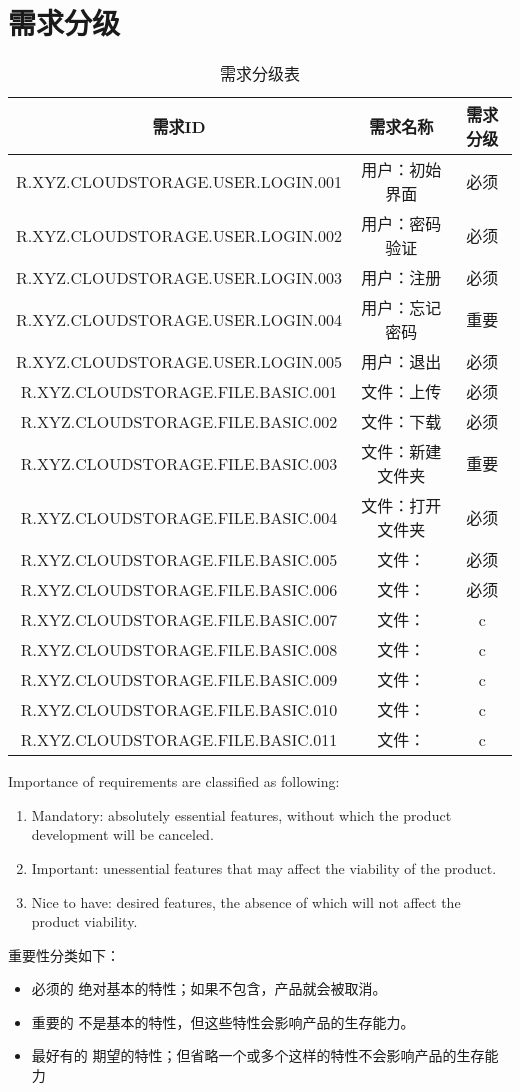 \chapter{需求分级}
\begin{table}[htbp]
\centering
\caption{需求分级表} \label{tab:classification}
\begin{tabular}{|c|c|c|}
    \hline
    需求ID & 需求名称 & 需求分级 \\
    \hline
    R.XYZ.CLOUDSTORAGE.USER.LOGIN.001 & 用户：初始界面 & 必须 \\
    \hline
    R.XYZ.CLOUDSTORAGE.USER.LOGIN.002 & 用户：密码验证 & 必须 \\
    \hline 
    R.XYZ.CLOUDSTORAGE.USER.LOGIN.003 & 用户：注册 & 必须 \\
    \hline
    R.XYZ.CLOUDSTORAGE.USER.LOGIN.004 & 用户：忘记密码 & 重要 \\
    \hline
    R.XYZ.CLOUDSTORAGE.USER.LOGIN.005 & 用户：退出 & 必须 \\
    \hline
    R.XYZ.CLOUDSTORAGE.FILE.BASIC.001 & 文件：上传 & 必须 \\
    \hline
    R.XYZ.CLOUDSTORAGE.FILE.BASIC.002 & 文件：下载 & 必须 \\
    \hline
    R.XYZ.CLOUDSTORAGE.FILE.BASIC.003 & 文件：新建文件夹 & 重要 \\
    \hline
    R.XYZ.CLOUDSTORAGE.FILE.BASIC.004 & 文件：打开文件夹 & 必须 \\
    \hline
    R.XYZ.CLOUDSTORAGE.FILE.BASIC.005 & 文件： & 必须 \\
    \hline
    R.XYZ.CLOUDSTORAGE.FILE.BASIC.006 & 文件： & 必须 \\
    \hline
    R.XYZ.CLOUDSTORAGE.FILE.BASIC.007 & 文件： & c \\
    \hline
    R.XYZ.CLOUDSTORAGE.FILE.BASIC.008 & 文件： & c \\
    \hline
    R.XYZ.CLOUDSTORAGE.FILE.BASIC.009 & 文件： & c \\
    \hline
    R.XYZ.CLOUDSTORAGE.FILE.BASIC.010 & 文件： & c \\
    \hline
    R.XYZ.CLOUDSTORAGE.FILE.BASIC.011 & 文件： & c \\
    \hline
\end{tabular}
\end{table}

Importance of requirements are classified as following:
\begin{enumerate}
\item Mandatory: absolutely essential features, without which the product development will be canceled.
\item Important: unessential features that may affect the viability of the product.
\item Nice to have: desired features, the absence of which will not affect the product viability.
\end{enumerate}

重要性分类如下：
\begin{itemize}
\item 必须的		绝对基本的特性；如果不包含，产品就会被取消。
\item 重要的		不是基本的特性，但这些特性会影响产品的生存能力。
\item 最好有的		期望的特性；但省略一个或多个这样的特性不会影响产品的生存能力
\end{itemize}
